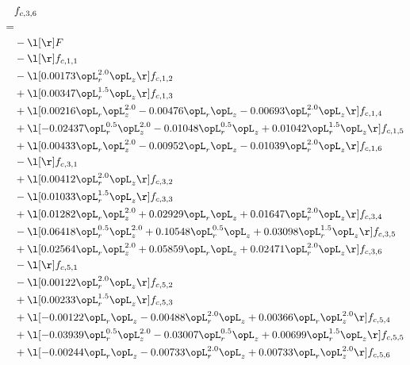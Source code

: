 \begin{alignat}{2} 
\label{eq:f_36_1} 
& f_{c,3,6} \nonumber \\ 
 = \\ 
& - \l[  \r] F \nonumber \\ 
& - \l[  \r] f_{c,1,1} \nonumber \\ 
& - \l[  0.00173 \opL_r^{2.0} \opL_z  \r] f_{c,1,2} \nonumber \\ 
& + \l[  0.00347 \opL_r^{1.5} \opL_z  \r] f_{c,1,3} \nonumber \\ 
& + \l[  0.00216 \opL_r \opL_z^{2.0}   -0.00476 \opL_r \opL_z   -0.00693 \opL_r^{2.0} \opL_z  \r] f_{c,1,4} \nonumber \\ 
& + \l[  -0.02437 \opL_r^{0.5} \opL_z^{2.0}   -0.01048 \opL_r^{0.5} \opL_z +  0.01042 \opL_r^{1.5} \opL_z  \r] f_{c,1,5} \nonumber \\ 
& + \l[  0.00433 \opL_r \opL_z^{2.0}   -0.00952 \opL_r \opL_z   -0.01039 \opL_r^{2.0} \opL_z  \r] f_{c,1,6} \nonumber \\ 
& - \l[  \r] f_{c,3,1} \nonumber \\ 
& + \l[  0.00412 \opL_r^{2.0} \opL_z  \r] f_{c,3,2} \nonumber \\ 
& - \l[  0.01033 \opL_r^{1.5} \opL_z  \r] f_{c,3,3} \nonumber \\ 
& + \l[  0.01282 \opL_r \opL_z^{2.0} +  0.02929 \opL_r \opL_z +  0.01647 \opL_r^{2.0} \opL_z  \r] f_{c,3,4} \nonumber \\ 
& - \l[  0.06418 \opL_r^{0.5} \opL_z^{2.0} +  0.10548 \opL_r^{0.5} \opL_z +  0.03098 \opL_r^{1.5} \opL_z  \r] f_{c,3,5} \nonumber \\ 
& + \l[  0.02564 \opL_r \opL_z^{2.0} +  0.05859 \opL_r \opL_z +  0.02471 \opL_r^{2.0} \opL_z  \r] f_{c,3,6} \nonumber \\ 
& - \l[  \r] f_{c,5,1} \nonumber \\ 
& - \l[  0.00122 \opL_r^{2.0} \opL_z  \r] f_{c,5,2} \nonumber \\ 
& + \l[  0.00233 \opL_r^{1.5} \opL_z  \r] f_{c,5,3} \nonumber \\ 
& + \l[  -0.00122 \opL_r \opL_z   -0.00488 \opL_r^{2.0} \opL_z +  0.00366 \opL_r \opL_z^{2.0}  \r] f_{c,5,4} \nonumber \\ 
& + \l[  -0.03939 \opL_r^{0.5} \opL_z^{2.0}   -0.03007 \opL_r^{0.5} \opL_z +  0.00699 \opL_r^{1.5} \opL_z  \r] f_{c,5,5} \nonumber \\ 
& + \l[  -0.00244 \opL_r \opL_z   -0.00733 \opL_r^{2.0} \opL_z +  0.00733 \opL_r \opL_z^{2.0}  \r] f_{c,5,6} \nonumber \\ 

\end{alignat}
